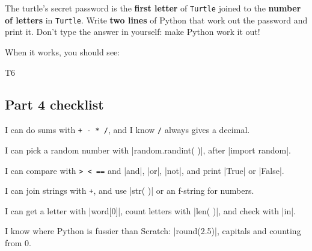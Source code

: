 \begin{puzzle}
The turtle's secret password is the \textbf{first letter} of \texttt{Turtle} joined to the \textbf{number of letters} in \texttt{Turtle}. Write \textbf{two lines} of Python that work out the password and print it. Don't type the answer in yourself: make Python work it out!

When it works, you should see:
\begin{outputbox}
T6
\end{outputbox}
\end{puzzle}

\subsection*{Part 4 checklist}
\tick I can do sums with \texttt{+ - * /}, and I know \texttt{/} always gives a decimal.\par
\tick I can pick a random number with \py|random.randint( )|, after \py|import random|.\par
\tick I can compare with \texttt{> < ==} and \py|and|, \py|or|, \py|not|, and print \py|True| or \py|False|.\par
\tick I can join strings with \texttt{+}, and use \py|str( )| or an f-string for numbers.\par
\tick I can get a letter with \py|word[0]|, count letters with \py|len( )|, and check with \py|in|.\par
\tick I know where Python is fussier than Scratch: \py|round(2.5)|, capitals and counting from 0.
